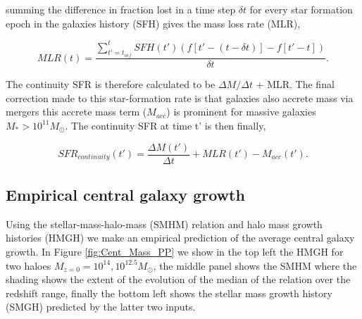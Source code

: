 summing the difference in fraction lost in a time step $\delta t$ for every star formation epoch in the galaxies history (SFH) gives the mass loss rate (MLR), 

\begin{equation}
\label{eqn:MLR}
MLR(t) = \frac{ \sum_{t' = t_{inf}}^{t} SFH(t')(f[t' - (t-\delta t)]-f[t' - t]) }{\delta t}.
\end{equation}

The continuity SFR is therefore calculated to be $\Delta M / \Delta t$ + MLR. The final correction made to this star-formation rate is that galaxies also accrete mass via mergers this accrete mass term ($M_{acc}$) is prominent for massive galaxies $M_* > 10^{11} M_{\odot}$. The continuity SFR at time t' is then finally,

\begin{equation}
    SFR_{continuity}(t') = \frac{\Delta M(t')}{\Delta t} + MLR(t') - M_{acc}(t').
\end{equation}

\subsection{Empirical central galaxy growth}

Using the stellar-mass-halo-mass (SMHM) relation and halo mass growth histories (HMGH) we make an empirical prediction of the average central galaxy growth. In Figure \ref{fig:Cent_Mass_PP} we show in the top left the HMGH for two haloes $M_{z=0} = 10^{14}, 10^{12.5} M_{\odot}$, the middle panel shows the SMHM where the shading shows the extent of the evolution of the median of the relation over the redshift range, finally the bottom left shows the stellar mass growth history (SMGH) predicted by the latter two inputs.

